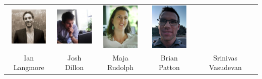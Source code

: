 \documentclass[10pt,
               xcolor={usenames,dvipsnames},
               hyperref={colorlinks,linktoc=all,citecolor=Plum,linkcolor=MidnightBlue,urlcolor=MidnightBlue},noamssymb]{beamer}
\begin{document}
\begin{frame}[plain]
\begin{center}
\begin{tabular}{ccccc}
\includegraphics[width=18mm]{img/ian.jpg} &
\includegraphics[width=18mm]{img/josh.jpg} &
\includegraphics[width=18mm]{img/maja.png} &
\includegraphics[width=18mm]{img/brian.png} &
\\
Ian Langmore & Josh Dillon & Maja Rudolph & Brian Patton & Srinivas Vasudevan \\
\end{tabular}

\vspace{-2ex}


\end{center}
\end{frame}
\end{document}
